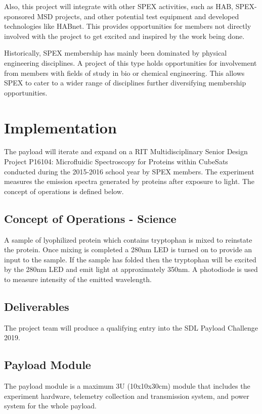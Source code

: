 \documentclass[conference]{IEEEtran} %
\begin{document}
Also, this project will integrate with other SPEX activities, such as HAB, SPEX-sponsored MSD projects, and other potential test equipment and developed technologies like HABnet. This provides opportunities for members not directly involved with the project to get excited and inspired by the work being done.

Historically, SPEX membership has mainly been dominated by physical engineering disciplines. A project of this type holds opportunities for involvement from members with fields of study in bio or chemical engineering. This allows SPEX to cater to a wider range of disciplines further diversifying membership opportunities. 


\section{Implementation}
\label{sec:implementation}
  
The payload will iterate and expand on a RIT Multidisciplinary Senior Design Project P16104: Microfluidic Spectroscopy for Proteins within CubeSats  conducted during the 2015-2016 school year by SPEX members. The experiment measures the emission spectra generated by proteins after exposure to light. The concept of operations is defined below. 

\subsection{Concept of Operations - Science}
\label{subsec:operations}
A sample of lyophilized protein which contains tryptophan is mixed to reinstate the protein. Once mixing is completed a 280nm LED is turned on to provide an input to the sample. If the sample has folded then the tryptophan will be excited by the 280nm LED and emit light at approximately 350nm. A photodiode is used to measure intensity of the emitted wavelength.

\subsection{Deliverables}
\label{subsec:deliverables}
The project team will produce a qualifying entry into the SDL Payload Challenge 2019. 

\subsection{Payload Module}
\label{subsec:payload}
The payload module is a maximum 3U (10x10x30cm) module that includes the experiment hardware, telemetry collection and transmission system, and power system for the whole payload.
\end{document}
